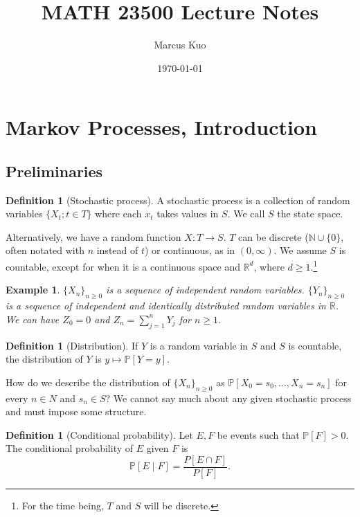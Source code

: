 \documentclass{tufte-handout}
\title{MATH 23500 Lecture Notes}
\author{Marcus Kuo}
\date{\today} %
\newcommand*\N{\mathbb{N}}
\newcommand*\R{\mathbb{R}}
\renewcommand*\P{\mathbb{P}}
\newtheorem{ex}[thm]{Example}
\theoremstyle{definition}
\newtheorem{defn}[thm]{Definition}
\begin{document}
\maketitle
\tableofcontents

\newpage

\section{Markov Processes, Introduction}
\subsection{Preliminaries}

\begin{defn}[Stochastic process]
	A stochastic process is a collection of random variables $\{X_t; t \in T\}$ where each $x_t$ takes values in $S$. We call $S$ the state space.

	Alternatively, we have a random function $X: T \to S$. $T$ can be discrete ($\N \cup \{0\}$, often notated with $n$ instead of $t$) or continuous, as in $(0,\infty)$. We assume $S$ is countable, except for when it is a continuous space and $\R^d$, where $d \ge 1$.\footnote{For the time being, $T$ and $S$ will be discrete.}
\end{defn}

\begin{ex}
	$\{X_n\}_{n \ge 0}$ is a sequence of independent random variables. $\{Y_n\}_{n \ge 0}$ is a sequence of independent and identically distributed random variables in $\R$. We can have $Z_0 = 0$ and $Z_n = \sum\limits_{j=1}^{n} Y_j$ for $n\ge 1$.
\end{ex}

\begin{defn}[Distribution]
	If $Y$ is a random variable in $S$ and $S$ is countable, the distribution of $Y$ is $y \mapsto \P\left[ Y= y \right]$.

How do we describe the distribution of $\{X_n\}_{n\ge 0}$ as $\P\left[ X_0 = s_0, \ldots, X_n = s_n \right]$ for every $n \in N$ and $s_n \in S$? We cannot say much about any given stochastic process and must impose some structure. 

\end{defn}

\begin{defn}[Conditional probability]
	Let $E,F$ be events such that $\P[F] > 0$. The conditional probability of $E$ given $F$ is \[
		\P[E \mid F] = \frac{P[E \cap F]}{P[F]}
	.\] 
\end{defn}
\end{document}
